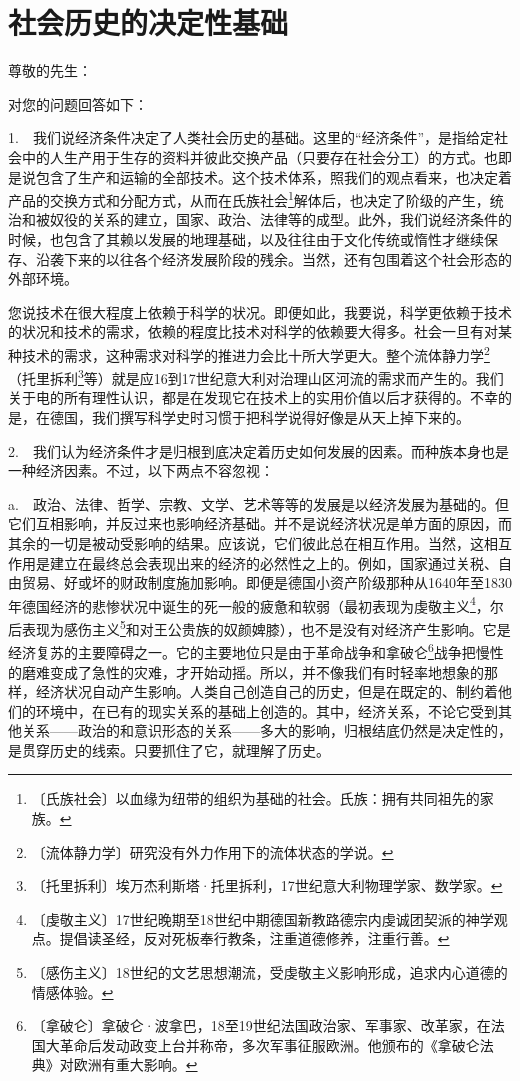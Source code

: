 \documentclass[12pt,UTF-8,openany]{ctexbook}
\begin{document}
\chapter{社会历史的决定性基础}

\begin{normalsize}
    
    \noindent 尊敬的先生：
    
    \vspace{24pt}
    
    对您的问题回答如下：
    
    1.~~我们说经济条件决定了人类社会历史的基础。这里的“经济条件”，是指给定社会中的人生产用于生存的资料并彼此交换产品（只要存在社会分工）的方式。也即是说包含了生产和运输的全部技术。这个技术体系，照我们的观点看来，也决定着产品的交换方式和分配方式，从而在氏族社会\footnote{〔氏族社会〕以血缘为纽带的组织为基础的社会。氏族：拥有共同祖先的家族。}解体后，也决定了阶级的产生，统治和被奴役的关系的建立，国家、政治、法律等的成型。此外，我们说经济条件的时候，也包含了其赖以发展的地理基础，以及往往由于文化传统或惰性才继续保存、沿袭下来的以往各个经济发展阶段的残余。当然，还有包围着这个社会形态的外部环境。
    
    您说技术在很大程度上依赖于科学的状况。即便如此，我要说，科学更依赖于技术的状况和技术的需求，依赖的程度比技术对科学的依赖要大得多。社会一旦有对某种技术的需求，这种需求对科学的推进力会比十所大学更大。整个流体静力学\footnote{〔流体静力学〕研究没有外力作用下的流体状态的学说。}（托里拆利\footnote{〔托里拆利〕埃万杰利斯塔·托里拆利，17世纪意大利物理学家、数学家。}等）就是应16到17世纪意大利对治理山区河流的需求而产生的。我们关于电的所有理性认识，都是在发现它在技术上的实用价值以后才获得的。不幸的是，在德国，我们撰写科学史时习惯于把科学说得好像是从天上掉下来的。
    
    2.~~我们认为经济条件才是归根到底决定着历史如何发展的因素。而种族本身也是一种经济因素。不过，以下两点不容忽视：
    
    a.~~政治、法律、哲学、宗教、文学、艺术等等的发展是以经济发展为基础的。但它们互相影响，并反过来也影响经济基础。并不是说经济状况是单方面的原因，而其余的一切是被动受影响的结果。应该说，它们彼此总在相互作用。当然，这相互作用是建立在最终总会表现出来的经济的必然性之上的。例如，国家通过关税、自由贸易、好或坏的财政制度施加影响。即便是德国小资产阶级那种从1640年至1830年德国经济的悲惨状况中诞生的死一般的疲惫和软弱（最初表现为虔敬主义\footnote{〔虔敬主义〕17世纪晚期至18世纪中期德国新教路德宗内虔诚团契派的神学观点。提倡读圣经，反对死板奉行教条，注重道德修养，注重行善。}，尔后表现为感伤主义\footnote{〔感伤主义〕18世纪的文艺思想潮流，受虔敬主义影响形成，追求内心道德的情感体验。}和对王公贵族的奴颜婢膝），也不是没有对经济产生影响。它是经济复苏的主要障碍之一。它的主要地位只是由于革命战争和拿破仑\footnote{〔拿破仑〕拿破仑·波拿巴，18至19世纪法国政治家、军事家、改革家，在法国大革命后发动政变上台并称帝，多次军事征服欧洲。他颁布的《拿破仑法典》对欧洲有重大影响。}战争把慢性的磨难变成了急性的灾难，才开始动摇。所以，并不像我们有时轻率地想象的那样，经济状况自动产生影响。人类自己创造自己的历史，但是在既定的、制约着他们的环境中，在已有的现实关系的基础上创造的。其中，经济关系，不论它受到其他关系——政治的和意识形态的关系——多大的影响，归根结底仍然是决定性的，是贯穿历史的线索。只要抓住了它，就理解了历史。
    

\end{normalsize}
\end{document}
